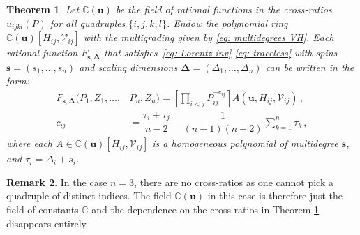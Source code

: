 \documentclass[12pt,a4paper]{extarticle}
\newtheorem{theorem}{Theorem}[section]
\theoremstyle{definition}
\newtheorem{remark}[theorem]{Remark}
\begin{document}
\begin{theorem} \label{thm:sec5}
    Let $\mathbb{C}(\mathbf{u})$ be the field of rational functions in the cross-ratios $u_{ijkl}(P)$ for all quadruples $\{i,j,k,l\}$.
    Endow the polynomial ring $\mathbb{C}(\mathbf{u})[H_{ij},\mathcal{V}_{ij}]$ with the multigrading given by \eqref{eq: multidegrees VH}. Each rational function $F_{\mathbf{s},\mathbf{\Delta}}$ that satisfies~\eqref{eq: Lorentz inv}-\eqref{eq: traceless} with spins $\mathbf{s}=(s_1,\ldots,s_n)$ and scaling dimensions $\mathbf{\Delta}=(\Delta_1,\ldots,\Delta_n)$ can be written in the form:
    \begin{equation} \label{eq:TheoremSec5}
    \begin{split}
        F_{\mathbf{s},\mathbf{\Delta}}(P_1,Z_1,\ldots,&P_n,Z_n)=\left[\prod_{i<j} P_{ij}^{-c_{ij}}\right]A(\mathbf{u},H_{ij},\mathcal{V}_{ij})\,,\\
        c_{ij}&= \dfrac{\tau_i+\tau_j}{n-2}-\dfrac{1}{(n-1)(n-2)}\sum\limits_{k=1}^n \tau_k\,,
    \end{split}
    \end{equation}
    where each $A\in \mathbb{C}(\mathbf{u})[H_{ij},\mathcal{V}_{ij}]$ is a homogeneous polynomial of multidegree $\mathbf{s}$, and $\tau_i=\Delta_i+s_i$.
\end{theorem}

\begin{remark}\label{rmk: no cross ratios}
    In the case $n=3$, there are no cross-ratios as one cannot pick a quadruple of distinct indices. The field $\mathbb{C}(\mathbf{u})$ in this case is therefore just the field of constants $\mathbb{C}$ and the dependence on the cross-ratios in Theorem \ref{thm:sec5} disappears entirely.
\end{remark}
\end{document}
